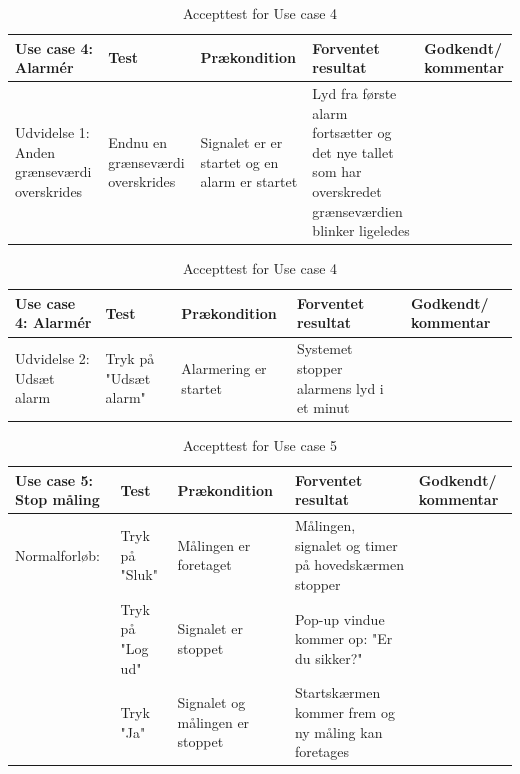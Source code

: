 \begin{table}[H]
\caption{Accepttest for Use case 4}\label{tab:tabel8}
\begin{tabular}{|>{\raggedright\arraybackslash}p{2.5cm}| >{\raggedright\arraybackslash}p{2.9cm} | >{\raggedright\arraybackslash}p{2.9cm} | >{\raggedright\arraybackslash}p{2.9cm} | >{\raggedright\arraybackslash}p{2.8cm} |}
   \hline
   \textbf{Use case 4: Alarmér } &\textbf{Test}& \textbf{Prækondition} & \textbf{Forventet resultat} & \textbf{Godkendt/ kommentar}\\ \hline
   Udvidelse 1: Anden grænseværdi overskrides & Endnu en grænseværdi overskrides & Signalet er er startet og en alarm er startet & Lyd fra første alarm fortsætter og det nye tallet som har overskredet grænseværdien blinker ligeledes &\\\hline
\end{tabular}
\end{table}



\begin{table}[H]
\caption{Accepttest for Use case 4}\label{tab:tabel8}
\begin{tabular}{|>{\raggedright\arraybackslash}p{2.5cm}| >{\raggedright\arraybackslash}p{2.9cm} | >{\raggedright\arraybackslash}p{2.9cm} | >{\raggedright\arraybackslash}p{2.9cm} | >{\raggedright\arraybackslash}p{2.8cm} |}
   \hline
   \textbf{Use case 4: Alarmér } &\textbf{Test}& \textbf{Prækondition} & \textbf{Forventet resultat} & \textbf{Godkendt/ kommentar}\\ \hline
   Udvidelse 2: Udsæt alarm & Tryk på "Udsæt alarm" & Alarmering er startet & Systemet stopper alarmens lyd i et minut &\\\hline
\end{tabular}
\end{table}




\begin{table}[H]
\caption{Accepttest for Use case 5}\label{tab:tabel8}
\begin{tabular}{|>{\raggedright\arraybackslash}p{2.5cm}| >{\raggedright\arraybackslash}p{2.9cm} | >{\raggedright\arraybackslash}p{2.9cm} | >{\raggedright\arraybackslash}p{2.9cm} | >{\raggedright\arraybackslash}p{2.8cm} |}
   \hline
   \textbf{Use case 5: Stop måling } &\textbf{Test}& \textbf{Prækondition} & \textbf{Forventet resultat} & \textbf{Godkendt/ kommentar}\\ \hline
   Normalforløb:& Tryk på "Sluk" & Målingen er foretaget & Målingen, signalet og timer på hovedskærmen stopper &\\\hline
   & Tryk på "Log ud" & Signalet er stoppet & Pop-up vindue kommer op: "Er du sikker?" &\\\hline
   &Tryk "Ja"&Signalet og målingen er stoppet& Startskærmen kommer frem og ny måling kan foretages &\\\hline
\end{tabular}
\end{table}


